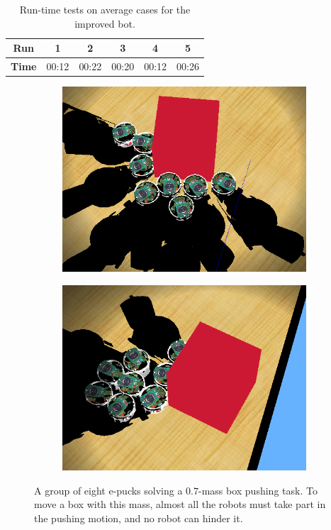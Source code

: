 \documentclass[a4paper,10pt]{article}
\begin{document}
\begin{table}[h]
    \centering
    \begin{tabular}{c|c|c|c|c|c}
        \textbf{Run}    & \textbf{1} & \textbf{2} & \textbf{3} &
        \textbf{4}      & \textbf{5}     \\ \hline
        \textbf{Time}   & 00:12 & 00:22 & 00:20 & 00:12 & 00:26 \\
    \end{tabular}
    \caption{Run-time tests on average cases for the improved bot.}
    \label{improved bot tests}
\end{table}

\begin{figure}[!h]
    \centering

    \begin{subfigure}[!h]{0.45\textwidth}
        \includegraphics[width=\textwidth]{models/stresstest.PNG}
    \end{subfigure}
    \begin{subfigure}[!h]{0.45\textwidth}
        \includegraphics[width=\textwidth]{models/stresstest2.PNG}
    \end{subfigure}

    \caption{A group of eight e-pucks solving a $0.7$-mass box pushing task.
    To move a box with this mass, almost all the robots must take part in the
    pushing motion, and no robot can hinder it.}
\end{figure}


\label{sec:b2}



 
\end{document}
